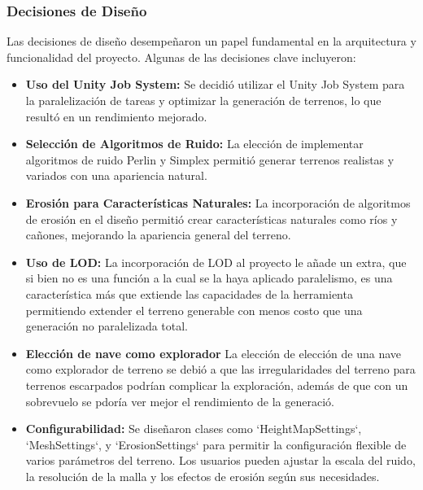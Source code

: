 \subsubsection{Decisiones de Diseño}
Las decisiones de diseño desempeñaron un papel fundamental en la arquitectura y funcionalidad del proyecto. Algunas de las decisiones clave incluyeron:

\begin{itemize}
    \item \textbf{Uso del Unity Job System:} Se decidió utilizar el Unity Job System para la paralelización de tareas y optimizar la generación de terrenos, lo que resultó en un rendimiento mejorado.
    
    \item \textbf{Selección de Algoritmos de Ruido:} La elección de implementar algoritmos de ruido Perlin y Simplex permitió generar terrenos realistas y variados con una apariencia natural.
    
    \item \textbf{Erosión para Características Naturales:} La incorporación de algoritmos de erosión en el diseño permitió crear características naturales como ríos y cañones, mejorando la apariencia general del terreno.
    
    \item \textbf{Uso de LOD:} La incorporación de LOD al proyecto le añade un extra, que si bien no es una función a la cual se la haya aplicado paralelismo, es una característica más que extiende las capacidades de la herramienta permitiendo extender el terreno generable con menos costo que una generación no paralelizada total.
    
    \item \textbf{Elección de nave como explorador} La elección de elección de una nave como explorador de terreno se debió a que las irregularidades del terreno para terrenos escarpados podrían complicar la exploración, además de que con un sobrevuelo se pdoría ver mejor el rendimiento de la generació.
    
    \item \textbf{Configurabilidad:} Se diseñaron clases como `HeightMapSettings`, `MeshSettings`, y `ErosionSettings` para permitir la configuración flexible de varios parámetros del terreno. Los usuarios pueden ajustar la escala del ruido, la resolución de la malla y los efectos de erosión según sus necesidades.

\end{itemize}

